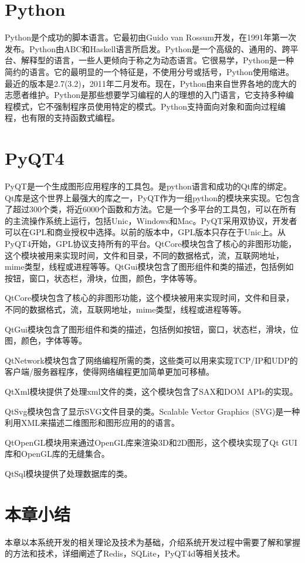 \documentclass{zjutthesis}
\begin{document}
\section{Python}
Python是个成功的脚本语言。它最初由Guido van Rossum开发，在1991年第一次发布。Python由ABC和Haskell语言所启发。Python是一个高级的、通用的、跨平台、解释型的语言，一些人更倾向于称之为动态语言。它很易学，Python是一种简约的语言。它的最明显的一个特征是，不使用分号或括号，Python使用缩进。最近的版本是2.7(3.2)，2011年二月发布。现在，Python由来自世界各地的庞大的志愿者维护。Python是那些想要学习编程的人的理想的入门语言，它支持多种编程模式，它不强制程序员使用特定的模式。Python支持面向对象和面向过程编程，也有限的支持函数式编程。

\section{PyQT4}
PyQT是一个生成图形应用程序的工具包。是python语言和成功的Qt库的绑定。Qt库是这个世界上最强大的库之一，PyQT作为一组python的模块来实现。它包含了超过300个类，将近6000个函数和方法。它是一个多平台的工具包，可以在所有的主流操作系统上运行，包括Unic，Windows和Mac。PyQT采用双协议，开发者可以在GPL和商业授权中选择。以前的版本中，GPL版本只存在于Unic上。从PyQT4开始，GPL协议支持所有的平台。QtCore模块包含了核心的非图形功能，这个模块被用来实现时间，文件和目录，不同的数据格式，流，互联网地址，mime类型，线程或进程等等。QtGui模块包含了图形组件和类的描述，包括例如按钮，窗口，状态栏，滑块，位图，颜色，字体等等。

QtCore模块包含了核心的非图形功能，这个模块被用来实现时间，文件和目录，不同的数据格式，流，互联网地址，mime类型，线程或进程等等。

QtGui模块包含了图形组件和类的描述，包括例如按钮，窗口，状态栏，滑块，位图，颜色，字体等等。

QtNetwork模块包含了网络编程所需的类，这些类可以用来实现TCP/IP和UDP的客户端/服务器程序，使得网络编程更加简单更加可移植。

QtXml模块提供了处理xml文件的类，这个模块包含了SAX和DOM APIs的实现。

QtSvg模块包含了显示SVG文件目录的类。Scalable Vector Graphics (SVG)是一种利用XML来描述二维图形和图形应用的的语言。

QtOpenGL模块用来通过OpenGL库来渲染3D和2D图形，这个模块实现了Qt GUI库和OpenGL库的无缝集合。

QtSql模块提供了处理数据库的类。

\section{本章小结}
本章以本系统开发的相关理论及技术为基础，介绍系统开发过程中需要了解和掌握的方法和技术，详细阐述了Redis，SQLite，PyQT4d等相关技术。
\end{document}
